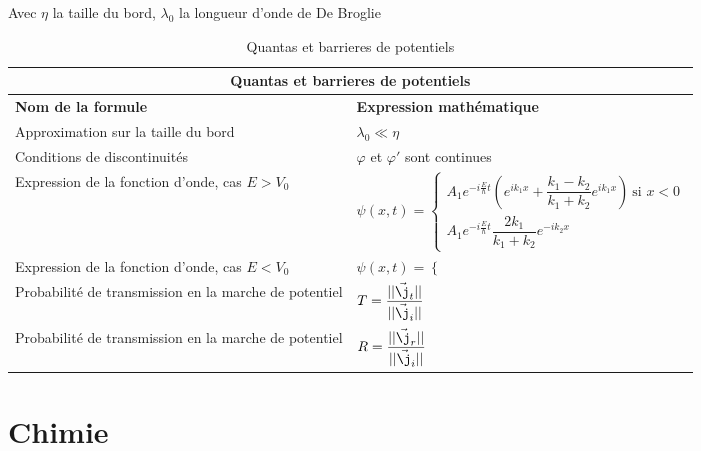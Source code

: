\documentclass[10pt,a4paper,titlepage,portrait]{article}
\renewcommand{\arraystretch}{2}
\renewcommand{\phi}
{
    \varphi
}
\begin{document}
Avec $\eta$ la taille du bord, $\lambda_0$ la longueur d'onde de De Broglie
\begin{table}[H]
    \centering
    \renewcommand{\arraystretch}{1.5} %
    \setlength{\tabcolsep}{8pt} %
    \begin{tabular}{@{}p{9cm}p{10cm}@{}}
        \toprule
        \multicolumn{2}{c}{\textbf{Quantas et barrieres de potentiels}} \\
        \midrule
        \textbf{Nom de la formule} & \textbf{Expression mathématique} \\
        \midrule

        Approximation sur la taille du bord & $\lambda_0 \ll \eta$ \\
        Conditions de discontinuités & $\phi$ et $\phi'$ sont continues \\
        Expression de la fonction d'onde, cas $E > V_0$ & $\psi(x,t) = \left\{\begin{array}{l}A_1e^{-i\frac{E}{\hbar}t}\left(e^{ik_1x} + \dfrac{k_1-k_2}{k_1+k_2}e^{ik_1x}\right) \ \text{si } x < 0\\ A_1 e^{-i\frac{E}{\hbar}t}\dfrac{2k_1}{k_1+k_2}e^{-ik_2x}\end{array}\right.$ \\
        Expression de la fonction d'onde, cas $E < V_0$ & $\psi(x,t) = \left\{\begin{array}{l}
        \end{array}\right.$ \\
        Probabilité de transmission en la marche de potentiel & $T = \dfrac{||\vec{\j}_t||}{||\vec{\j}_i||}$ \\
        Probabilité de transmission en la marche de potentiel & $R = \dfrac{||\vec{\j}_r||}{||\vec{\j}_i||}$ \\


\bottomrule
\end{tabular}
\caption{Quantas et barrieres de potentiels}
\label{tab:quantpos}
\end{table}

\section{Chimie}
\end{document}
